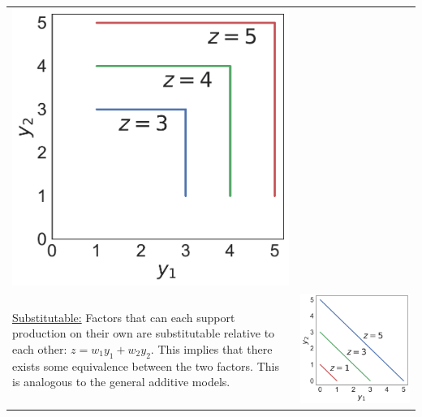 \begin{table}[h!]
\begin{tabular}{m{}c}
\begin{minipage}{.17\textwidth}
      \includegraphics[width=\textwidth, height=.975\textwidth]{Figures/Antagonistic.pdf}
    \end{minipage}
    \\
    \vspace{-5pt}
    \uline{Substitutable:} Factors that can each support production on their own are substitutable relative to each other: $z = w_1y_1 + w_2y_2$. This implies that there exists some equivalence between the two factors. This is analogous to the general additive models.
    &
    \begin{minipage}{.17\textwidth}
      \includegraphics[width=\textwidth, height=.975\textwidth]{Figures/Substitutable.pdf}

\end{minipage}
\end{tabular}
\end{table}
